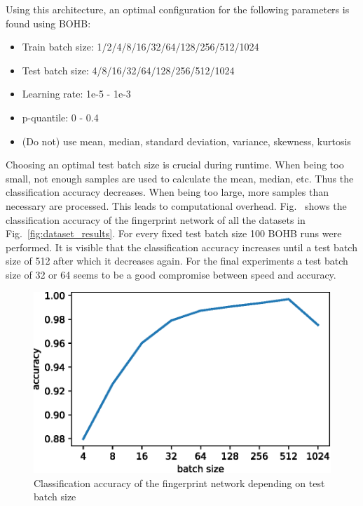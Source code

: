 \documentclass{article}
\begin{document}
Using this architecture, an optimal configuration for the following parameters is found using BOHB:
%
\begin{itemize}
\item Train batch size: 1/2/4/8/16/32/64/128/256/512/1024
\item Test batch size: 4/8/16/32/64/128/256/512/1024
\item Learning rate: 1e-5 - 1e-3
\item p-quantile: 0 - 0.4
\item (Do not) use mean, median, standard deviation, variance, skewness, kurtosis
\end{itemize}
%
Choosing an optimal test batch size is crucial during runtime. When being too small, not enough samples are used to calculate the mean, median, etc. Thus the classification accuracy decreases. When being too large, more samples than necessary are processed. This leads to computational overhead. Fig.~ shows the classification accuracy of the fingerprint network of all the datasets in Fig.~\ref{fig:dataset_results}. For every fixed test batch size 100 BOHB runs were performed. It is visible that the classification accuracy increases until a test batch size of 512 after which it decreases again. For the final experiments a test batch size of 32 or 64 seems to be a good compromise between speed and accuracy. 
%
\begin{figure}[htb]
\begin{center}
 	\includegraphics[width=0.7\linewidth]{../figures/batch_size_acc.eps} 
\end{center}
\caption{Classification accuracy of the fingerprint network depending on test batch size}
\label{fig:batch_size_acc}
\end{figure} 
%
\end{document}
